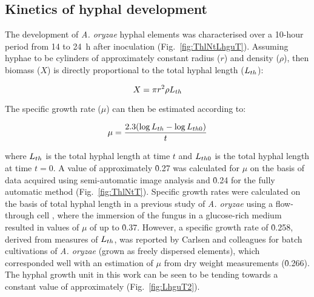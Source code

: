 \subsection{Kinetics of hyphal development}\label{sec:KinHyphDev}

The development of \emph{A. oryzae} hyphal elements was characterised over a 10-hour period from 14 to 24~h after inoculation (Fig.~\ref{fig:ThlNtLhguT}).  Assuming hyphae to be cylinders of approximately constant radius ($r$) and density ($\rho$), then biomass ($X$) is directly proportional to the total hyphal length ($L_{th}$):

\begin{equation} \label{eq:XpirLh}
	X = \pi r^2 \rho L_{th}
\end{equation}

\noindent The specific growth rate ($\mu$) can then be estimated according to:

\begin{equation} \label{eq:MuLhT}
	\mu = \frac{2.3(\log L_{th} - \log L_{th0})}{t}
\end{equation}

\noindent where $L_{th}$ is the total hyphal length at time $t$ and $L_{th0}$ is the total hyphal length at time $t = 0$. A value of approximately \h{0.27} was calculated for $\mu$ on the basis of data acquired using semi-automatic image analysis and \h{0.24} for the fully automatic method (Fig.~\ref{fig:ThlNtT}). Specific growth rates were calculated on the basis of total hyphal length in a previous study of \emph{A. oryzae} using a flow-through cell \cite{spohr1998}, where the immersion of the fungus in a glucose-rich medium resulted in values of $\mu$ of up to \h{0.37}. However, a specific growth rate of \h{0.258}, derived from measures of $L_{th}$, was reported by Carlsen and colleagues for batch cultivations of \emph{A. oryzae} (grown as freely dispersed elements), which corresponded well with an estimation of $\mu$ from dry weight measurements (\h{0.266}). The hyphal growth unit in this work can be seen to be tending towards a constant value of approximately  (Fig.~\ref{fig:LhguT2}).

